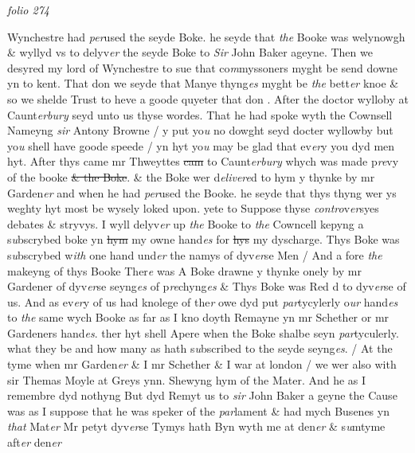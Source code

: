 \documentclass[12pt, a4paper]{book}
\begin{document}
\dotfill
					

\textit{folio 274}


Wynchestre had \textit{per}used the seyde Boke. he seyde that \textit{the} Booke was welynowgh \& wyllyd vs to delyv\textit{er} the seyde Boke 
			to \textit{Sir} John Baker ageyne. Then we desyred my lord of Wynchestre to sue that co\textit{m}myssoners myght be send downe  yn to kent. That don we seyde that Manye thyng\textit{es} myght be \textit{the} bett\textit{er} knoe \& so we shelde Trust to heve a goode quyeter that don
			. After the doctor wylloby at Caunt\textit{erbury} seyd unto us thyse wordes. That he had spoke wyth the Cownsell Nameyng \textit{sir} Antony Browne / y put yo\textit{u} no dowght seyd docter wyllowby but 
			yo\textit{u}  shell have goode speede / yn hyt yo\textit{u} may be glad that ev\textit{er}y you dyd men hyt. After thys came mr Thweyttes \sout{cam }to Caunt\textit{erbury} whych was made p\textit{re}vy of the booke \sout{\& the Boke}. \& the Boke wer d\textit{elivere}d to hym y thynke by mr Garden\textit{er} and  when he had \textit{per}used the Booke. he seyde that thys thyng wer ys weghty  hyt most be wysely loked upon. yete to Suppose thyse \textit{contro}v\textit{er}syes debates \& stryvys. I wyll delyv\textit{er} up \textit{the} Booke to \textit{the} Cowncell kepyng a s\textit{u}bscrybed boke yn \sout{hym }
               my 
			owne hand\textit{es} for \sout{hys }
               my
			 dyscharge. Thys Boke was s\textit{u}bscrybed w\textit{ith} one hand und\textit{er} the namys of dyv\textit{er}se Men / And a fore \textit{the} makeyng of thys Booke Ther\textit{e} was A Boke drawne y thynke onely by mr Gardener of dyv\textit{er}se seyng\textit{es} of p\textit{re}chyng\textit{es} \& Thys Boke was Red d to dyv\textit{er}se of us. And as ev\textit{er}y of us had knolege of the\textit{r} owe dyd put \textit{par}tycylerly o\textit{ur} hand\textit{es} to \textit{the}  same wych Booke as far as I kno doyth Remayne yn mr Schether or mr Gardeners hand\textit{es}. ther hyt shell Apere when the Boke shalbe seyn \textit{par}tyculerly. what they be and how many as hath s\textit{u}bscribed to the seyde seyng\textit{es}. / At the tyme when mr Garden\textit{er} \& I mr Schether \& I war at london / we wer also with sir Themas Moyle at Greys ynn.  Shewyng hym of the Mater. And he as I remembre dyd nothyng But dyd Remyt us to \textit{sir} John Baker a geyne the Cause was as I suppose that he was speker of the \textit{par}lament \& had mych Busenes yn \textit{that} Mat\textit{er} Mr petyt dyv\textit{er}se Tymys hath Byn wyth me at den\textit{er} \& s\textit{u}mtyme aft\textit{er} den\textit{er}
\end{document}
